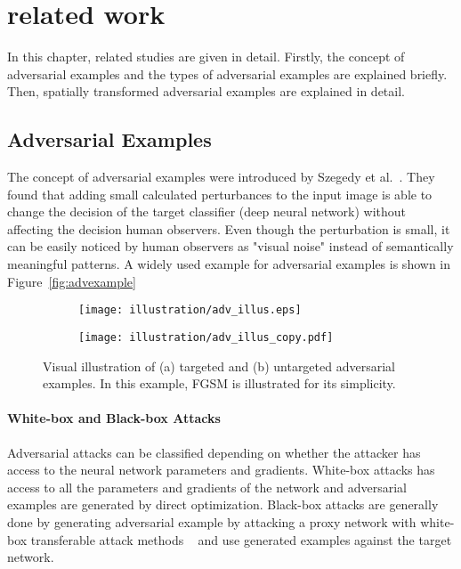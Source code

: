 \chapter{related work}
\label{chp:2_literature}

In this chapter, related studies are given in detail. Firstly, the concept of adversarial examples and the types of adversarial examples are explained briefly. Then, spatially transformed adversarial examples are explained in detail.
\section{Adversarial Examples}

The concept of adversarial examples were introduced by Szegedy et al.~\cite{szegedy2013intriguing}. They found that adding small calculated perturbances to the input image is able to change the decision of the target classifier (deep neural network) without affecting the decision human observers. Even though the perturbation is small, it can be easily noticed by human observers as "visual noise" instead of semantically meaningful patterns. A widely used example for adversarial examples is shown in Figure~\ref{fig:advexample}

\begin{figure}[h]
    \centering
    \begin{subfigure}{\linewidth}
        \texttt{[image: illustration/adv\_illus.eps]}
        \caption{}
    \end{subfigure}
    \begin{subfigure}{\linewidth}
        \texttt{[image: illustration/adv\_illus\_copy.pdf]}
        \caption{}
    \end{subfigure}
    \caption[Visual illustration of adversarial examples. ]{Visual illustration of (a) targeted and (b) untargeted adversarial examples. In this example, FGSM is illustrated for its simplicity.}
\end{figure}


\subsubsection*{White-box and Black-box Attacks}
Adversarial attacks can be classified depending on whether the attacker has access to the neural network parameters and gradients. White-box attacks has access to all the parameters and gradients of the network and adversarial examples are generated by direct optimization. Black-box attacks are generally done by generating adversarial example by attacking a proxy network with white-box transferable attack methods ~\cite{tramer2017space} and use generated examples against the target network.

